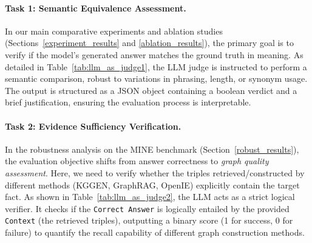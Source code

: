 \documentclass{article}
\theoremstyle{plain}
\theoremstyle{definition}
\theoremstyle{remark}
\begin{document}
\paragraph{Task 1: Semantic Equivalence Assessment.}
In our main comparative experiments and ablation studies (Sections~\ref{experiment_results} and \ref{ablation_results}), the primary goal is to verify if the model's generated answer matches the ground truth in meaning. As detailed in Table~\ref{tab:llm_as_judge1}, the LLM judge is instructed to perform a semantic comparison, robust to variations in phrasing, length, or synonym usage. The output is structured as a JSON object containing a boolean verdict and a brief justification, ensuring the evaluation process is interpretable.

\paragraph{Task 2: Evidence Sufficiency Verification.}
In the robustness analysis on the MINE benchmark (Section~\ref{robust_results}), the evaluation objective shifts from answer correctness to \textit{graph quality assessment}. Here, we need to verify whether the triples retrieved/constructed by different methods (KGGEN, GraphRAG, OpenIE) explicitly contain the target fact. As shown in Table~\ref{tab:llm_as_judge2}, the LLM acts as a strict logical verifier. It checks if the \texttt{Correct Answer} is logically entailed by the provided \texttt{Context} (the retrieved triples), outputting a binary score (1 for success, 0 for failure) to quantify the recall capability of different graph construction methods.
\end{document}
